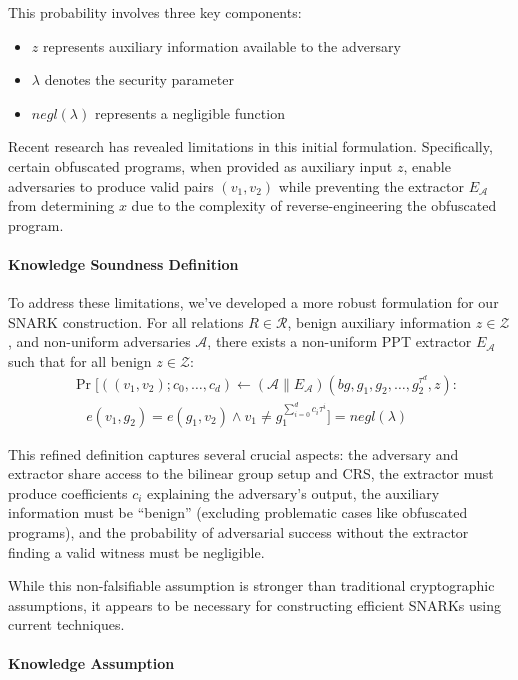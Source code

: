 This probability involves three key components:
\begin{itemize}
    \item $z$ represents auxiliary information available to the adversary
    \item $\lambda$ denotes the security parameter
    \item $negl(\lambda)$ represents a negligible function
\end{itemize}

Recent research has revealed limitations in this initial formulation. Specifically, certain obfuscated programs, when provided as auxiliary input $z$, enable adversaries to produce valid pairs $(v_1, v_2)$ while preventing the extractor $E_\mathcal{A}$ from determining $x$ due to the complexity of reverse-engineering the obfuscated program.

\paragraph{Knowledge Soundness Definition}

To address these limitations, we've developed a more robust formulation for our SNARK construction. For all relations $R \in \mathcal{R}$, benign auxiliary information $z \in \mathcal{Z}$, and non-uniform adversaries $\mathcal{A}$, there exists a non-uniform PPT extractor $E_\mathcal{A}$ such that for all benign $z \in \mathcal{Z}$:
\[ \begin{aligned}
&\Pr[((v_1, v_2); c_0, \dots, c_d) \gets (\mathcal{A} \| E_\mathcal{A})(bg, g_1, g_2, \dots, g_2^{\tau^d}, z) : \\
&\quad e(v_1, g_2) = e(g_1, v_2) \land v_1 \neq g_1^{\sum_{i=0}^d c_i \tau^i}] = negl(\lambda)
\end{aligned} \]

This refined definition captures several crucial aspects: the adversary and extractor share access to the bilinear group setup and CRS, the extractor must produce coefficients $c_i$ explaining the adversary's output, the auxiliary information must be ``benign'' (excluding problematic cases like obfuscated programs), and the probability of adversarial success without the extractor finding a valid witness must be negligible.

While this non-falsifiable assumption is stronger than traditional cryptographic assumptions, it appears to be necessary for constructing efficient SNARKs using current techniques.

\paragraph{Knowledge Assumption}

